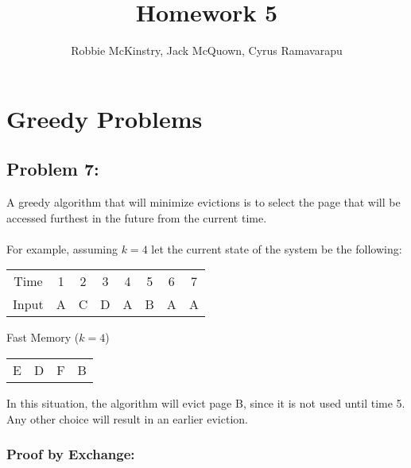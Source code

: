 \documentclass[12pt]{article}
\begin{document}
\title{Homework 5}
\author{Robbie McKinstry, Jack McQuown, Cyrus Ramavarapu}
\renewcommand{\today}{12 September 2016}
\renewcommand{\baselinestretch}{1.5}

\maketitle

\section*{Greedy Problems}
\subsection*{Problem 7:}
A greedy algorithm that will minimize evictions is to 
select the page that will be accessed furthest in the future
from the current time.\\\\
For example, assuming $k=4$ let the current state of the system be the
following:
\begin{center}
    \begin{tabular}{c|c|c|c|c|c|c|c}
    Time & 1 & 2 & 3 & 4 & 5 & 6 & 7 \\
    Input & A & C & D & A & B & A & A \\   
    \end{tabular}
    Fast Memory ($k=4$) 
    \begin{tabular}{c|c|c|c}
    E & D & F & B 
    \end{tabular}
\end{center}
In this situation, the algorithm will evict page B, since
it is not used until time 5.  Any other choice will result
in an earlier eviction. 
\subsubsection*{Proof by Exchange:}
\end{document}
